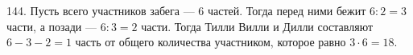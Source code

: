 144. Пусть всего участников забега --- 6 частей. Тогда перед ними бежит $6:2=3$ части, а позади --- $6:3=2$ части. Тогда Тилли Вилли и Дилли составляют $6-3-2=1$ часть от общего количества участником, которое равно $3\cdot6=18.$\\
